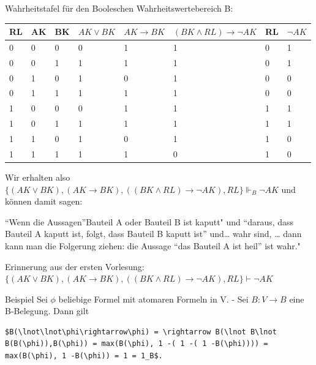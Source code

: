 \documentclass[a4paper]{article}
\begin{document}
\begin{multicols}{3}
  Wahrheitstafel für den Booleschen Wahrheitswertebereich B:

  \begin{tabular}{llllllll}
    RL & AK & BK & $AK\vee BK$ & $AK\rightarrow BK$ & $(BK\wedge RL)\rightarrow\lnot AK$ & RL & $\lnot AK$ \\\hline
    0  & 0  & 0  & 0           & 1                  & 1                                  & 0  & 1          \\
    0  & 0  & 1  & 1           & 1                  & 1                                  & 0  & 1          \\
    0  & 1  & 0  & 1           & 0                  & 1                                  & 0  & 0          \\
    0  & 1  & 1  & 1           & 1                  & 1                                  & 0  & 0          \\
    1  & 0  & 0  & 0           & 1                  & 1                                  & 1  & 1          \\
    1  & 0  & 1  & 1           & 1                  & 1                                  & 1  & 1          \\
    1  & 1  & 0  & 1           & 0                  & 1                                  & 1  & 0          \\
    1  & 1  & 1  & 1           & 1                  & 0                                  & 1  & 0          \\
  \end{tabular}

  Wir erhalten also
  $\{(AK\vee BK),(AK\rightarrow BK), ((BK\wedge RL)\rightarrow \lnot AK),RL\} \Vdash_B \lnot AK$
  und können damit sagen:

  ``Wenn die Aussagen''Bauteil A oder Bauteil B ist kaputt" und ``daraus,
  dass Bauteil A kaputt ist, folgt, dass Bauteil B kaputt ist''
  und\ldots{} wahr sind, \ldots{} dann kann man die Folgerung ziehen: die
  Aussage ``das Bauteil A ist heil'' ist wahr."

  Erinnerung aus der ersten Vorlesung:
  $\{(AK\vee BK),(AK\rightarrow BK), ((BK\wedge RL)\rightarrow \lnot AK),RL\} \vdash  \lnot AK$

  Beispiel Sei $\phi$ beliebige Formel mit atomaren Formeln in V. - Sei
  $B:V\rightarrow B$ eine B-Belegung. Dann gilt

  \begin{verbatim}
$B(\lnot\lnot\phi\rightarrow\phi) = \rightarrow B(\lnot B\lnot B(B(\phi)),B(\phi)) = max(B(\phi), 1 -( 1 -( 1 -B(\phi)))) = max(B(\phi), 1 -B(\phi)) = 1 = 1_B$.


\end{verbatim}
\end{multicols}
\end{document}
